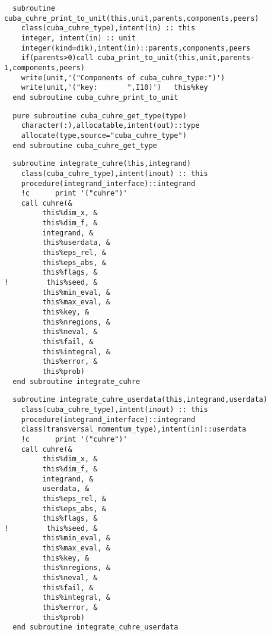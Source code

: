 \begin{Verbatim}
  subroutine cuba_cuhre_print_to_unit(this,unit,parents,components,peers)
    class(cuba_cuhre_type),intent(in) :: this
    integer, intent(in) :: unit
    integer(kind=dik),intent(in)::parents,components,peers
    if(parents>0)call cuba_print_to_unit(this,unit,parents-1,components,peers)
    write(unit,'("Components of cuba_cuhre_type:")')
    write(unit,'("key:       ",I10)')   this%key
  end subroutine cuba_cuhre_print_to_unit
\end{Verbatim}
\begin{Verbatim}
  pure subroutine cuba_cuhre_get_type(type)
    character(:),allocatable,intent(out)::type
    allocate(type,source="cuba_cuhre_type")
  end subroutine cuba_cuhre_get_type
\end{Verbatim}
\begin{Verbatim}
  subroutine integrate_cuhre(this,integrand)
    class(cuba_cuhre_type),intent(inout) :: this  
    procedure(integrand_interface)::integrand
    !c      print '("cuhre")'
    call cuhre(&
         this%dim_x, &
         this%dim_f, &
         integrand, &
         this%userdata, &
         this%eps_rel, &
         this%eps_abs, &
         this%flags, &
!         this%seed, &
         this%min_eval, &
         this%max_eval, &
         this%key, &
         this%nregions, &
         this%neval, &
         this%fail, &
         this%integral, &
         this%error, &
         this%prob)
  end subroutine integrate_cuhre
\end{Verbatim}

\begin{Verbatim}
  subroutine integrate_cuhre_userdata(this,integrand,userdata)
    class(cuba_cuhre_type),intent(inout) :: this
    procedure(integrand_interface)::integrand
    class(transversal_momentum_type),intent(in)::userdata
    !c      print '("cuhre")'
    call cuhre(&
         this%dim_x, &
         this%dim_f, &
         integrand, &
         userdata, &
         this%eps_rel, &
         this%eps_abs, &
         this%flags, &
!         this%seed, &
         this%min_eval, &
         this%max_eval, &
         this%key, &
         this%nregions, &
         this%neval, &
         this%fail, &
         this%integral, &
         this%error, &
         this%prob)
  end subroutine integrate_cuhre_userdata
\end{Verbatim}

